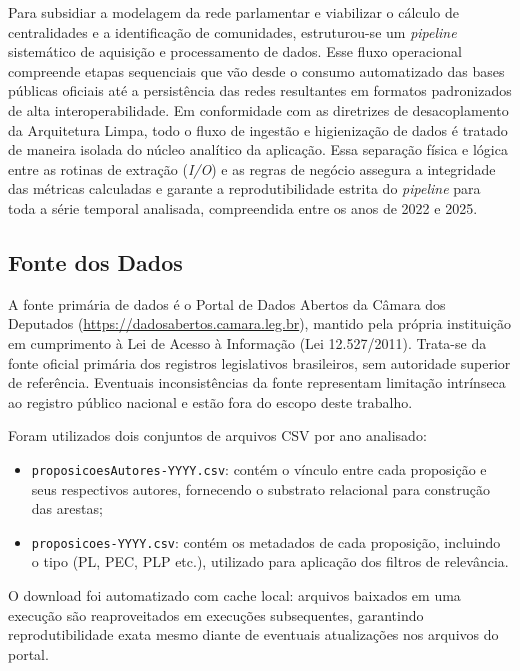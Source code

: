 \documentclass[
      12pt,
      a4paper,
      openright,
      oneside,
      chapter=TITLE,
      section=TITLE,
      english,
      french,
      spanish,
      brazilian
    ]{abntex2}
\begin{document}
    Para subsidiar a modelagem da rede parlamentar e viabilizar o cálculo de centralidades e a identificação de comunidades, estruturou-se um \textit{pipeline} sistemático de aquisição e processamento de dados. Esse fluxo operacional compreende etapas sequenciais que vão desde o consumo automatizado das bases públicas oficiais até a persistência das redes resultantes em formatos padronizados de alta interoperabilidade. Em conformidade com as diretrizes de desacoplamento da Arquitetura Limpa, todo o fluxo de ingestão e higienização de dados é tratado de maneira isolada do núcleo analítico da aplicação. Essa separação física e lógica entre as rotinas de extração (\textit{I/O}) e as regras de negócio assegura a integridade das métricas calculadas e garante a reprodutibilidade estrita do \textit{pipeline} para toda a série temporal analisada, compreendida entre os anos de 2022 e 2025.
    
    \subsection{Fonte dos Dados}
    
    A fonte primária de dados é o Portal de Dados Abertos da Câmara dos Deputados (\url{https://dadosabertos.camara.leg.br}), mantido pela própria instituição em cumprimento à Lei de Acesso à Informação (Lei 12.527/2011). Trata-se da fonte oficial primária dos registros legislativos brasileiros, sem autoridade superior de referência. Eventuais inconsistências da fonte representam limitação intrínseca ao registro público nacional e estão fora do escopo deste trabalho.
    
    Foram utilizados dois conjuntos de arquivos CSV por ano analisado:
    
    \begin{itemize}
        \item \texttt{proposicoesAutores-YYYY.csv}: contém o vínculo entre cada proposição e seus respectivos autores, fornecendo o substrato relacional para construção das arestas;
        \item \texttt{proposicoes-YYYY.csv}: contém os metadados de cada proposição, incluindo o tipo (PL, PEC, PLP etc.), utilizado para aplicação dos filtros de relevância.
    \end{itemize}
    
    O download foi automatizado com cache local: arquivos baixados em uma execução são reaproveitados em execuções subsequentes, garantindo reprodutibilidade exata mesmo diante de eventuais atualizações nos arquivos do portal.
    
\end{document}
